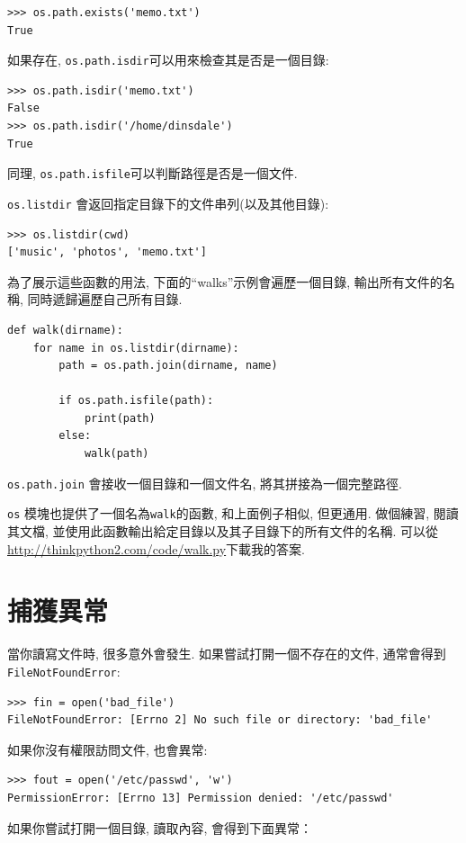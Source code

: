 \documentclass[10pt]{book}
\begin{document}
\begin{verbatim}
>>> os.path.exists('memo.txt')
True
\end{verbatim}
%
如果存在, {\tt os.path.isdir}可以用來檢查其是否是一個目錄:

\begin{verbatim}
>>> os.path.isdir('memo.txt')
False
>>> os.path.isdir('/home/dinsdale')
True
\end{verbatim}
%
同理, {\tt os.path.isfile}可以判斷路徑是否是一個文件. 

{\tt os.listdir} 會返回指定目錄下的文件串列(以及其他目錄):

\begin{verbatim}
>>> os.listdir(cwd)
['music', 'photos', 'memo.txt']
\end{verbatim}
%
為了展示這些函數的用法, 下面的``walks''示例會遍歷一個目錄, 
輸出所有文件的名稱, 同時遞歸遍歷自己所有目錄. 

\begin{verbatim}
def walk(dirname):
    for name in os.listdir(dirname):
        path = os.path.join(dirname, name)

        if os.path.isfile(path):
            print(path)
        else:
            walk(path)
\end{verbatim}
%

{\tt os.path.join} 會接收一個目錄和一個文件名, 將其拼接為一個完整路徑. 

{\tt os} 模塊也提供了一個名為{\tt walk}的函數, 和上面例子相似, 但更通用. 
做個練習, 閱讀其文檔, 並使用此函數輸出給定目錄以及其子目錄下的所有文件的名稱. 
可以從\url{http://thinkpython2.com/code/walk.py}下載我的答案. 


\section{捕獲異常}
\label{catch}

當你讀寫文件時, 很多意外會發生. 
如果嘗試打開一個不存在的文件, 通常會得到{\tt FileNotFoundError}:

\begin{verbatim}
>>> fin = open('bad_file')
FileNotFoundError: [Errno 2] No such file or directory: 'bad_file'

\end{verbatim}
%
如果你沒有權限訪問文件, 也會異常:

\begin{verbatim}
>>> fout = open('/etc/passwd', 'w')
PermissionError: [Errno 13] Permission denied: '/etc/passwd'
\end{verbatim}
%
如果你嘗試打開一個目錄, 讀取內容, 會得到下面異常：
\end{document}
